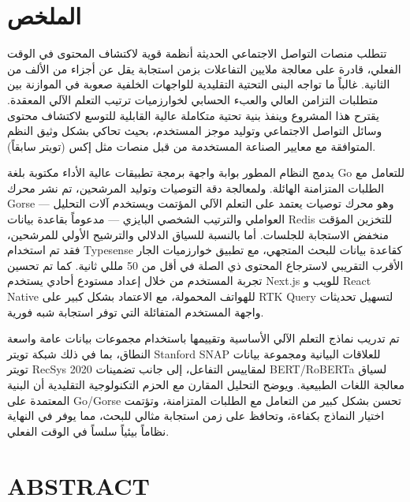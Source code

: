 \documentclass[12pt,a4paper]{report}
\begin{document}
\chapter*{\textarabic{الملخص}}

\begin{Arabic}
\begingroup
\fontsize{11pt}{13.2pt}\selectfont
تتطلب منصات التواصل الاجتماعي الحديثة أنظمة قوية لاكتشاف المحتوى في الوقت الفعلي، قادرة على معالجة ملايين التفاعلات بزمن استجابة يقل عن أجزاء من الألف من الثانية. غالباً ما تواجه البنى التحتية التقليدية للواجهات الخلفية صعوبة في الموازنة بين متطلبات التزامن العالي والعبء الحسابي لخوارزميات ترتيب التعلم الآلي المعقدة. يقترح هذا المشروع وينفذ بنية تحتية متكاملة عالية القابلية للتوسع لاكتشاف محتوى وسائل التواصل الاجتماعي وتوليد موجز المستخدم، بحيث تحاكي بشكل وثيق النظم المتوافقة مع معايير الصناعة المستخدمة من قبل منصات مثل إكس (تويتر سابقاً).

يدمج النظام المطور بوابة واجهة برمجة تطبيقات عالية الأداء مكتوبة بلغة Go للتعامل مع الطلبات المتزامنة الهائلة. ولمعالجة دقة التوصيات وتوليد المرشحين، تم نشر محرك Gorse --- وهو محرك توصيات يعتمد على التعلم الآلي المؤتمت ويستخدم آلات التحليل العواملي والترتيب الشخصي البايزي --- مدعوماً بقاعدة بيانات Redis للتخزين المؤقت منخفض الاستجابة للجلسات. أما بالنسبة للسياق الدلالي والترشيح الأولي للمرشحين، فقد تم استخدام Typesense كقاعدة بيانات للبحث المتجهي، مع تطبيق خوارزميات الجار الأقرب التقريبي لاسترجاع المحتوى ذي الصلة في أقل من 50 مللي ثانية. كما تم تحسين تجربة المستخدم من خلال إعداد مستودع أحادي يستخدم Next.js للويب و React Native للهواتف المحمولة، مع الاعتماد بشكل كبير على RTK Query لتسهيل تحديثات واجهة المستخدم المتفائلة التي توفر استجابة شبه فورية.

تم تدريب نماذج التعلم الآلي الأساسية وتقييمها باستخدام مجموعات بيانات عامة واسعة النطاق، بما في ذلك شبكة تويتر Stanford SNAP للعلاقات البيانية ومجموعة بيانات تويتر RecSys 2020 لمقاييس التفاعل، إلى جانب تضمينات BERT/RoBERTa لسياق معالجة اللغات الطبيعية. ويوضح التحليل المقارن مع الحزم التكنولوجية التقليدية أن البنية المعتمدة على Go/Gorse تحسن بشكل كبير من التعامل مع الطلبات المتزامنة، وتؤتمت اختيار النماذج بكفاءة، وتحافظ على زمن استجابة مثالي للبحث، مما يوفر في النهاية نظاماً بيئياً سلساً في الوقت الفعلي.
\par\endgroup
\end{Arabic}


\chapter*{ABSTRACT}
\end{document}
